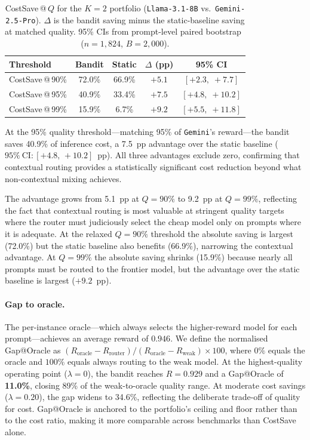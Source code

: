 \begin{table}[htbp]
\centering
\small
\caption{CostSave\,@\,$Q$ for the $K{=}2$ portfolio
(\texttt{Llama-3.1-8B} vs.\ \texttt{Gemini-2.5-Pro}).
$\Delta$ is the bandit saving minus the static-baseline saving
at matched quality.  95\% CIs from prompt-level paired
bootstrap~\cite{efron1993bootstrap}
($n{=}1{,}824$, $B{=}2{,}000$).}
\label{tab:costsave_k2}
\begin{tabular}{lcccc}
\toprule
Threshold & Bandit & Static & $\Delta$ (pp) & 95\% CI \\
\midrule
CostSave\,@\,90\% & 72.0\% & 66.9\% & $+5.1$ & $[+2.3,\; +7.7]$ \\
CostSave\,@\,95\% & 40.9\% & 33.4\% & $+7.5$ & $[+4.8,\; +10.2]$ \\
CostSave\,@\,99\% & 15.9\% & \phantom{0}6.7\% & $+9.2$ & $[+5.5,\; +11.8]$ \\
\bottomrule
\end{tabular}
\end{table}

At the 95\% quality threshold---matching 95\% of \texttt{Gemini}'s
reward---the bandit saves 40.9\% of inference cost, a 7.5~pp
advantage over the static baseline ($95\%~\text{CI}:
[+4.8,\, +10.2]$~pp).  All three advantages exclude zero,
confirming that contextual routing provides a statistically
significant cost reduction beyond what non-contextual mixing achieves.

The advantage grows from 5.1~pp at $Q{=}90\%$ to 9.2~pp at
$Q{=}99\%$, reflecting the fact that contextual routing is most
valuable at stringent quality targets where the router must
judiciously select the cheap model only on prompts where it
is adequate.
At the relaxed $Q{=}90\%$ threshold the absolute saving is largest
(72.0\%) but the static baseline also benefits (66.9\%),
narrowing the contextual advantage.
At $Q{=}99\%$ the absolute saving shrinks (15.9\%) because nearly
all prompts must be routed to the frontier model, but the advantage
over the static baseline is largest ($+9.2$~pp).

\paragraph{Gap to oracle.}
\label{sec:gap_oracle}
The per-instance oracle---which always selects the higher-reward model
for each prompt---achieves an average reward of $0.946$.
We define the normalised Gap@Oracle as
$(R_{\text{oracle}} - R_{\text{router}}) /
 (R_{\text{oracle}} - R_{\text{weak}}) \times 100$,
where $0\%$ equals the oracle and $100\%$ equals always routing to the
weak model.
At the highest-quality operating point ($\lambda{=}0$), the bandit
reaches $R{=}0.929$ and a Gap@Oracle of \textbf{11.0\%}, closing
89\% of the weak-to-oracle quality range.
At moderate cost savings ($\lambda{=}0.20$), the gap widens to 34.6\%,
reflecting the deliberate trade-off of quality for cost.
Gap@Oracle is anchored to the portfolio's ceiling and floor rather than
to the cost ratio, making it more comparable across benchmarks than
CostSave alone.

